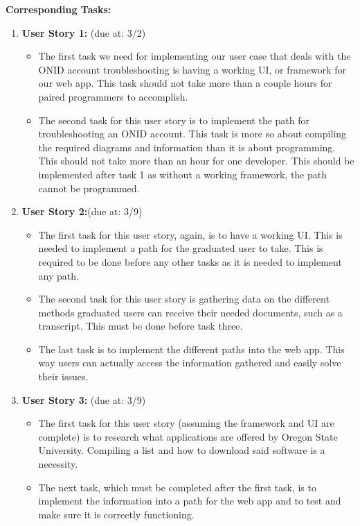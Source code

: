 \documentclass[12pt, letterpaper]{article}
\begin{document}
	
	
	\textbf{Corresponding Tasks:}
	
	\begin{enumerate}
	\item \textbf{User Story 1:}  (due at: 3/2) 
	\begin{itemize}
		\item The first task we need for implementing our user case that deals with the ONID account troubleshooting is having a working UI, or framework for our web app. This task should not take more than a couple hours for paired programmers to accomplish.
		\item The second task for this user story is to implement the path for troubleshooting an ONID account. This task is more so about compiling the required diagrams and information than it is about programming. This should not take more than an hour for one developer. This should be implemented after task 1 as without a working framework, the path cannot be programmed.
	\end{itemize}
	\item \textbf{User Story 2:}(due at: 3/9)
	\begin{itemize}
		\item The first task for this user story, again, is to have a working UI. This is needed to implement a path for the graduated user to take. This is required to be done before any other tasks as it is needed to implement any path.
		\item The second task for this user story is gathering data on the different methods graduated users can receive their needed documents, such as a transcript. This must be done before task three.
		\item The last task is to implement the different paths into the web app. This way users can actually access the information gathered and easily solve their issues.
	\end{itemize}
	\item \textbf{User Story 3:} (due at: 3/9) 
	\begin{itemize}
		\item The first task for this user story (assuming the framework and UI are complete) is to research what applications are offered by Oregon State University. Compiling a list and how to download said software is a necessity.
		\item The next task, which must be completed after the first task, is to implement the information into a path for the web app and to test and make sure it is correctly functioning.

\end{itemize}
\end{enumerate}
\end{document}
